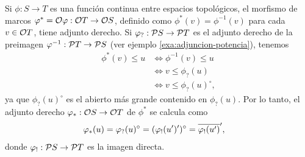 \begin{exa}%
  \label{exa:adjunto-derecho-top}
  Si $\phi:S\to T$ es una función continua entre espacios
  topológicos, el morfismo de marcos
  $\phi^*=\cal O\phi:\cal OT\to\cal OS$,
  definido como $\phi^*(v)=\phi^{-1}(v)$ para cada $v\in\cal OT$,
  tiene adjunto derecho.
  Si $\phi_?:\cal PS\to\cal PT$ es el adjunto derecho de la
  preimagen $\phi^{-1}:\cal PT\to\cal PS$ (ver ejemplo
  \ref{exa:adjuncion-potencia}), tenemos
  \begin{align*}
    \phi^*(v) \leq u
    &\iff \phi^{-1}(v) \leq u \\
    &\iff v \leq \phi_?(u) \\
    &\iff v\leq \phi_?(u)^\circ,
  \end{align*}
  ya que $\phi_?(u)^\circ$ es el abierto más grande contenido en
  $\phi_?(u)$.
  Por lo tanto, el adjunto derecho $\phi_*:\cal OS\to\cal OT$ de
  $\phi^*$ se calcula como
  \begin{align*}
    \phi_*(u) &= \phi_?(u)^\circ = (\phi_!(u')')^\circ = \ol{\phi_!(u')}',
  \end{align*}
  donde $\phi_!:\cal PS\to\cal PT$ es la imagen directa.
\end{exa}

